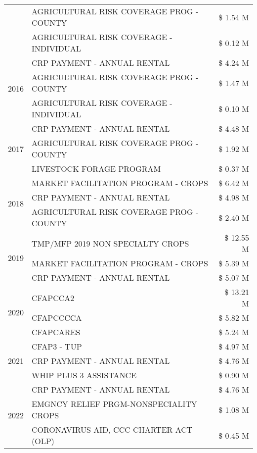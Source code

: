 \begin{tabular}{llr}
 & AGRICULTURAL RISK COVERAGE PROG - COUNTY & \$ 1.54 M \\
 & AGRICULTURAL RISK COVERAGE - INDIVIDUAL & \$ 0.12 M \\
\cline{1-3}
\multirow[t]{3}{*}{2016} & CRP PAYMENT - ANNUAL RENTAL & \$ 4.24 M \\
 & AGRICULTURAL RISK COVERAGE PROG - COUNTY & \$ 1.47 M \\
 & AGRICULTURAL RISK COVERAGE - INDIVIDUAL & \$ 0.10 M \\
\cline{1-3}
\multirow[t]{3}{*}{2017} & CRP PAYMENT - ANNUAL RENTAL & \$ 4.48 M \\
 & AGRICULTURAL RISK COVERAGE PROG - COUNTY & \$ 1.92 M \\
 & LIVESTOCK FORAGE PROGRAM & \$ 0.37 M \\
\cline{1-3}
\multirow[t]{3}{*}{2018} & MARKET FACILITATION PROGRAM - CROPS & \$ 6.42 M \\
 & CRP PAYMENT - ANNUAL RENTAL & \$ 4.98 M \\
 & AGRICULTURAL RISK COVERAGE PROG - COUNTY & \$ 2.40 M \\
\cline{1-3}
\multirow[t]{3}{*}{2019} & TMP/MFP 2019 NON SPECIALTY CROPS & \$ 12.55 M \\
 & MARKET FACILITATION PROGRAM - CROPS & \$ 5.39 M \\
 & CRP PAYMENT - ANNUAL RENTAL & \$ 5.07 M \\
\cline{1-3}
\multirow[t]{3}{*}{2020} & CFAPCCA2 & \$ 13.21 M \\
 & CFAPCCCCA & \$ 5.82 M \\
 & CFAPCARES & \$ 5.24 M \\
\cline{1-3}
\multirow[t]{3}{*}{2021} & CFAP3 - TUP & \$ 4.97 M \\
 & CRP PAYMENT - ANNUAL RENTAL & \$ 4.76 M \\
 & WHIP PLUS 3 ASSISTANCE & \$ 0.90 M \\
\cline{1-3}
\multirow[t]{3}{*}{2022} & CRP PAYMENT - ANNUAL RENTAL & \$ 4.76 M \\
 & EMGNCY RELIEF PRGM-NONSPECIALITY CROPS & \$ 1.08 M \\
 & CORONAVIRUS AID, CCC CHARTER ACT (OLP) & \$ 0.45 M \\
\cline{1-3}
\bottomrule
\end{tabular}
